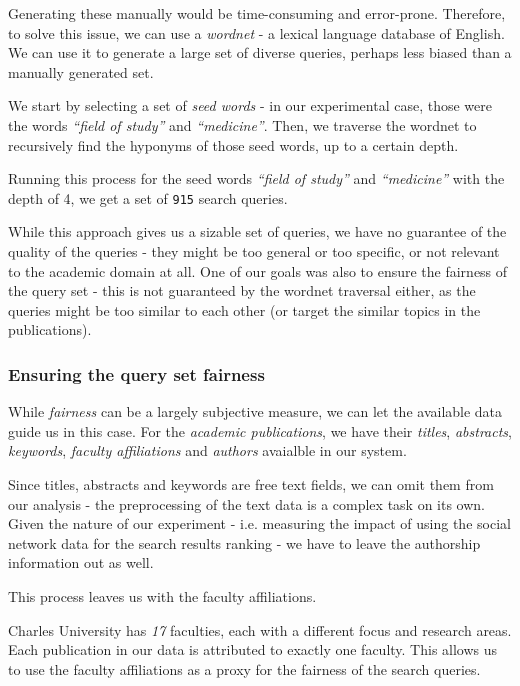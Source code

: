 Generating these manually would be time-consuming and error-prone. 
Therefore, to solve this issue, we can use a \textit{wordnet} - a lexical language database of English.
We can use it to generate a large set of diverse queries, perhaps less biased than a manually generated set.

We start by selecting a set of \textit{seed words} - in our experimental case, those were the words \textit{``field of study''} and \textit{``medicine''}.
Then, we traverse the wordnet to recursively find the hyponyms of those seed words, up to a certain depth.

Running this process for the seed words \textit{``field of study''} and \textit{``medicine''} with the depth of 4, we get a set of \texttt{915} search queries.

While this approach gives us a sizable set of queries, we have no guarantee of the quality of the queries - they might be too general or too specific, or not relevant to the academic domain at all.
One of our goals was also to ensure the fairness of the query set - this is not guaranteed by the wordnet traversal either, as the queries might be too similar to each other (or target the similar topics in the publications).

\subsubsection{Ensuring the query set fairness}

While \textit{fairness} can be a largely subjective measure, we can let the available data guide us in this case.
For the \textit{academic publications}, we have their \textit{titles}, \textit{abstracts}, \textit{keywords}, \textit{faculty affiliations} and \textit{authors} avaialble in our system.

Since titles, abstracts and keywords are free text fields, we can omit them from our analysis - the preprocessing of the text data is a complex task on its own.
Given the nature of our experiment - i.e. measuring the impact of using the social network data for the search results ranking - we have to leave the authorship information out as well.

This process leaves us with the faculty affiliations.

Charles University has \textit{17} faculties, each with a different focus and research areas.
Each publication in our data is attributed to exactly one faculty.
This allows us to use the faculty affiliations as a proxy for the fairness of the search queries.

